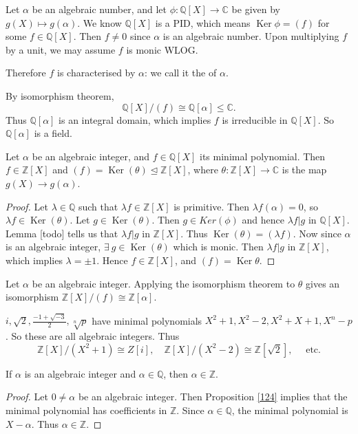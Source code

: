 \documentclass[egregdoesnotlikesansseriftitles,a4paper]{scrartcl}
\begin{document}
\begin{definition*}
       Let $\alpha$ be an algebraic number, and let $\phi: \mathbb{Q}[X] \rightarrow \mathbb{C}$ be given by $g (X) \mapsto g (\alpha)$. We know $\mathbb{Q}[X]$ is a PID, which means $\operatorname{Ker}\phi= (f)$ for some $f \in \mathbb{Q}[X]$. Then $f \neq 0$ since $\alpha$ is an algebraic number. Upon multiplying $f$ by a unit, we may assume $f$ is monic WLOG. 

       Therefore $f$ is characterised by $\alpha$: we call it the  of $\alpha$.
       \begin{remark}
            By isomorphism theorem, \[
            \mathbb{Q}[X]/(f) \cong \mathbb{Q}[\alpha] \leq \mathbb{C}
            .\] Thus $\mathbb{Q}[\alpha]$ is an integral domain, which implies $f$ is irreducible in $\mathbb{Q}[X]$. So $\mathbb{Q}[\alpha]$ is a field.
     \end{remark}
\end{definition*}
\begin{proposition}\label{124}
       Let $\alpha$ be an algebraic integer, and $f \in \mathbb{Q}[X]$ its minimal polynomial. Then $f \in \mathbb{Z}[X]$ and $(f)=\operatorname{Ker}(\theta) \unlhd \mathbb{Z}[X]$, where $\theta: \mathbb{Z}[X] \rightarrow \mathbb{C}$ is the map $g (X)\rightarrow g (\alpha)$. 
       \begin{proof}
              Let $\lambda \in \mathbb{Q}$ such that $\lambda f \in \mathbb{Z}[X]$ is primitive. Then $\lambda f (\alpha)=0$, so $\lambda f \in \operatorname{Ker}(\theta)$. Let $g \in \operatorname{Ker}(\theta)$. Then $g \in Ker (\phi)$ and hence $\lambda f |g $ in $\mathbb{Q}[X]$. Lemma [todo] tells us that $\lambda f |g $ in $\mathbb{Z}[X] $. Thus $\operatorname{Ker}(\theta)=(\lambda f)$. Now since $\alpha$ is an algebraic integer, $\exists \ g \in \operatorname{Ker}(\theta)$ which is monic. Then $\lambda f|g $ in $\mathbb{Z}[X]$, which implies $\lambda= \pm 1$. Hence $f \in \mathbb{Z}[X]$, and $(f)=\operatorname{Ker}\theta$.
       \end{proof}
\end{proposition}
Let $\alpha$ be an algebraic integer. Applying the isomorphism theorem to $\theta$ gives an isomorphism $\mathbb{Z}[X]/(f) \cong \mathbb{Z}[\alpha]$.
\begin{example*}
       $i, \sqrt{2} , \frac{-1+\sqrt{-3} }{2}, \sqrt[n]{p}$ have minimal polynomials $X^2+1, X^2-2, X^2+X+1, X^{n }-p$. So these are all algebraic integers. Thus \[
       \mathbb{Z}[X]/(X^2+1)\cong Z[i], \quad \mathbb{Z}[X]/(X^2-2)\cong \mathbb{Z}[\sqrt{2} ],\quad  \text{ etc} 
       .\] 
\end{example*}
\begin{corollary}
       If $\alpha$ is an algebraic integer and $\alpha \in \mathbb{Q}$, then $\alpha \in \mathbb{Z}$. 
       \begin{proof}
              Let $0 \neq \alpha$ be an algebraic integer. Then Proposition \ref{124} implies that the minimal polynomial has coefficients in $\mathbb{Z}$. Since $\alpha \in \mathbb{Q}$, the minimal polynomial is $X-\alpha$. Thus $\alpha \in \mathbb{Z}$. 
       \end{proof}
\end{corollary}
\newpage
\end{document}
